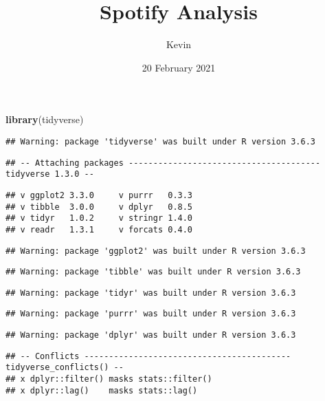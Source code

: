 \documentclass[]{article}
\title{Spotify Analysis}
\author{Kevin}
\date{20 February 2021}
\newenvironment{Shaded}{\begin{snugshade}}{\end{snugshade}}
\newcommand{\KeywordTok}[1]{\textcolor[rgb]{0.13,0.29,0.53}{\textbf{#1}}}
\newcommand{\NormalTok}[1]{#1}
\begin{document}
\maketitle

\begin{Shaded}
\begin{Highlighting}[]
\KeywordTok{library}\NormalTok{(tidyverse)}
\end{Highlighting}
\end{Shaded}

\begin{verbatim}
## Warning: package 'tidyverse' was built under R version 3.6.3
\end{verbatim}

\begin{verbatim}
## -- Attaching packages --------------------------------------- tidyverse 1.3.0 --
\end{verbatim}

\begin{verbatim}
## v ggplot2 3.3.0     v purrr   0.3.3
## v tibble  3.0.0     v dplyr   0.8.5
## v tidyr   1.0.2     v stringr 1.4.0
## v readr   1.3.1     v forcats 0.4.0
\end{verbatim}

\begin{verbatim}
## Warning: package 'ggplot2' was built under R version 3.6.3
\end{verbatim}

\begin{verbatim}
## Warning: package 'tibble' was built under R version 3.6.3
\end{verbatim}

\begin{verbatim}
## Warning: package 'tidyr' was built under R version 3.6.3
\end{verbatim}

\begin{verbatim}
## Warning: package 'purrr' was built under R version 3.6.3
\end{verbatim}

\begin{verbatim}
## Warning: package 'dplyr' was built under R version 3.6.3
\end{verbatim}

\begin{verbatim}
## -- Conflicts ------------------------------------------ tidyverse_conflicts() --
## x dplyr::filter() masks stats::filter()
## x dplyr::lag()    masks stats::lag()
\end{verbatim}
\end{document}
